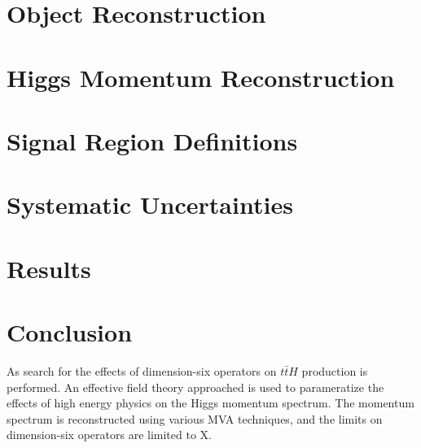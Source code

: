 \documentclass[NOTE, atlasdraft=true, texlive=2016, UKenglish]{\ATLASLATEXPATH atlasdoc}
\begin{document}
\section{Object Reconstruction}
\label{sec:objReco}


\section{Higgs Momentum Reconstruction}
\label{sec:mva}


\section{Signal Region Definitions}
\label{sec:signal_region}


\section{Systematic Uncertainties}
\label{sec:sys}


\section{Results}
\label{sec:results}


\section{Conclusion}
\label{sec:conclusion}

As search for the effects of dimension-six operators on $t\bar{t}H$ production is performed. An effective field theory approached is used to parameratize the effects of high energy physics on the Higgs momentum spectrum. The momentum spectrum is reconstructed using various MVA techniques, and the limits on dimension-six operators are limited to X. 
\end{document}
